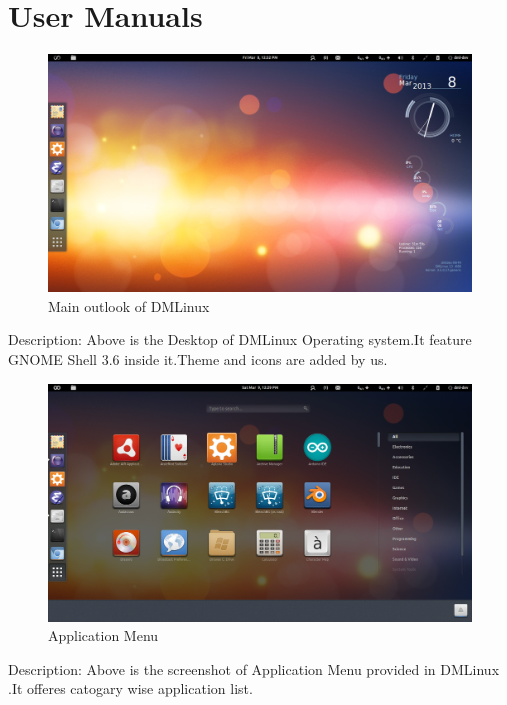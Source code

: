 \chapter{User Manuals}

\begin{figure}[h]
\begin{center}
  \includegraphics[scale=0.35] {1.png}
  \caption[Screenshot - DMLinux Main Desktop]{Main outlook of DMLinux}
\end{center}
\end{figure}
Description: Above is the Desktop of DMLinux Operating system.It feature GNOME Shell 3.6 inside it.Theme and icons are added by us.

\newpage
\begin{figure}[h]
\begin{center}
  \includegraphics[scale=0.35] {2.png}
  \caption[Screenshot - Application Menu]{Application Menu}
\end{center}
\end{figure}
Description: Above is the screenshot of Application Menu provided in DMLinux .It offeres catogary wise application list.

